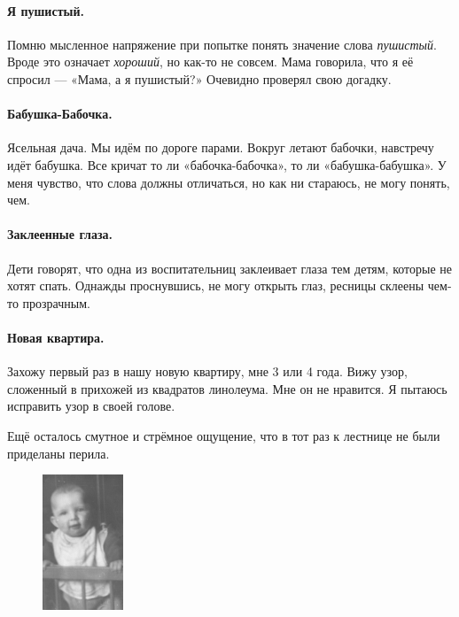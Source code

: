 \documentclass{book}
\begin{document}
\paragraph{Я пушистый.}
Помню мысленное напряжение при попытке понять значение слова \textit{пушистый}.
Вроде это означает \textit{хороший}, но как-то не совсем.
Мама говорила, что я её спросил --- «Мама, а я пушистый?» 
Очевидно проверял свою догадку.

{\sloppy

\paragraph{Бабушка-Бабочка.}
Ясельная дача.
Мы идём по дороге парами.
Вокруг летают бабочки, навстречу идёт бабушка.
Все кричат то ли «бабочка-бабочка», то ли «бабушка-бабушка».
У меня чувство, что слова должны отличаться, 
но как ни стараюсь, не могу понять, чем.

}

\paragraph{Заклеенные глаза.}
Дети говорят, что одна из воспитательниц заклеивает 
глаза тем детям, которые не хотят спать.
Однажды проснувшись, не могу открыть глаз,
ресницы склеены чем-то прозрачным.

\paragraph{Новая квартира.}
Захожу первый раз в нашу новую квартиру, мне 3 или 4 года.
Вижу узор, сложенный в прихожей из квадратов линолеума. 
Мне он не нравится.
Я пытаюсь исправить узор в своей голове.

Ещё осталось смутное и стрёмное ощущение, что в тот раз к лестнице не были приделаны перила.

\begin{figure}
\vskip-0mm
\centering
\includegraphics[width=24mm,angle=0]{pics/tosha-krovatka}
\end{figure}
\end{document}
